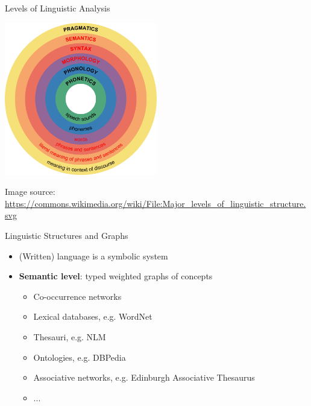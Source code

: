\begin{frame}{Levels of Linguistic Analysis}
	\vspace{-15pt}
	
  \begin{center}
  	\includegraphics[width=0.5\textwidth]{figures/levels2}
  \end{center}
   
{  \tiny
  Image source: \url{https://commons.wikimedia.org/wiki/File:Major_levels_of_linguistic_structure.svg}
 } 

\end{frame}




\begin{frame}{Linguistic Structures and Graphs}
	
	\begin{itemize}
		\item (Written) language is a \alert{symbolic system}
		\item \textbf{Semantic level}: typed weighted graphs of concepts
		\begin{itemize}
				\item Co-occurrence networks
 
		\item Lexical databases, e.g. WordNet
		\item Thesauri, e.g. NLM
		\item Ontologies, e.g. DBPedia
		\item Associative networks, e.g.  Edinburgh Associative Thesaurus
		\item ...
		
		\end{itemize}
	\end{itemize}	
	
\end{frame}






